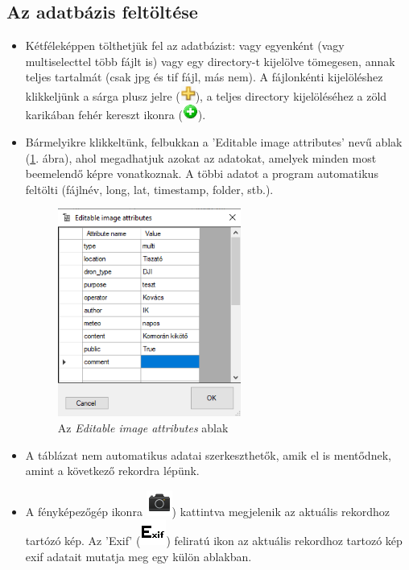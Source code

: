 \documentclass[a4paper,12pt]{article}
\begin{document}
\subsection{Az adatbázis feltöltése}

\begin{itemize}
	\item Kétféleképpen tölthetjük fel az adatbázist: vagy egyenként (vagy multiselecttel több fájlt is) vagy egy directory-t kijelölve tömegesen, annak teljes tartalmát (csak jpg és tif fájl, más nem). A fájlonkénti kijelöléshez klikkeljünk a sárga plusz jelre (\includegraphics[width=0.5cm]{plus.png}), a teljes directory kijelöléséhez a zöld karikában fehér kereszt ikonra (\includegraphics[width=0.5cm]{addfolder.png}).
	
	\item Bármelyikre klikkeltünk, felbukkan a 'Editable image attributes' nevű ablak (\ref{fig:editableimageattribute}. ábra), ahol megadhatjuk azokat az adatokat, amelyek minden most beemelendő képre vonatkoznak. A többi adatot a program automatikus feltölti (fájlnév, long, lat, timestamp, folder, stb.).
	
	\begin{figure}
		\centering
		\includegraphics[width=6cm]{editableimageattributes.png}
		\caption{Az \textit{Editable image attributes} ablak}
		\label{fig:editableimageattribute}
	\end{figure}
	
	\item A táblázat nem automatikus adatai szerkeszthetők, amik el is mentődnek, amint a következő rekordra lépünk.
	
	\item A fényképezőgép ikonra \includegraphics[width = 0.5 cm]{camera.png}) kattintva megjelenik az aktuális rekordhoz tartózó kép. Az 'Exif' (\includegraphics[width = 0.6 cm]{exif.png}) feliratú ikon az aktuális rekordhoz tartozó kép exif adatait mutatja meg egy külön ablakban.
\end{itemize}
\end{document}
